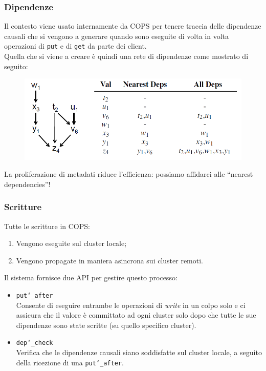 \begin{frame}
\frametitle{Dipendenze}
Il contesto viene usato internamente da COPS per tenere traccia delle dipendenze causali
che si vengono a generare quando sono eseguite di volta in volta operazioni di \texttt{put}
e di \texttt{get} da parte dei client. \\
Quella che si viene a creare è quindi una rete di dipendenze come mostrato di seguito:
\begin{figure}
	\centering
	\includegraphics[scale=0.35]{COPS/COPS4.png}
\end{figure}
La proliferazione di metadati riduce l'efficienza: possiamo affidarci
alle ``nearest dependencies''!
\end{frame}

\begin{frame}
\frametitle{Scritture}
Tutte le scritture in COPS:
\begin{enumerate}
	\item Vengono eseguite sul cluster locale;
	\item Vengono propagate in maniera asincrona sui cluster remoti.
\end{enumerate}
Il sistema fornisce due API per gestire questo processo:
\begin{itemize}
	\item \texttt{put\char`_after} \\
		  Consente di eseguire entrambe le operazioni di \emph{write} in un 
		  colpo solo e ci assicura che il valore è committato ad ogni cluster solo dopo che tutte
		  le sue dipendenze sono state scritte (su quello specifico cluster).
	\item \texttt{dep\char`_check} \\
		  Verifica che le dipendenze causali siano soddisfatte sul cluster locale, a seguito
		  della ricezione di una \texttt{put\char`_after}.
\end{itemize}
\end{frame}

